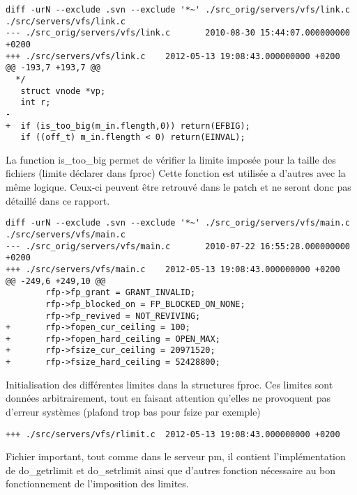 \documentclass[9pt , a4paper]{report}
\begin{document}
\begin{lstlisting}
diff -urN --exclude .svn --exclude '*~' ./src_orig/servers/vfs/link.c ./src/servers/vfs/link.c
--- ./src_orig/servers/vfs/link.c       2010-08-30 15:44:07.000000000 +0200
+++ ./src/servers/vfs/link.c    2012-05-13 19:08:43.000000000 +0200
@@ -193,7 +193,7 @@
  */
   struct vnode *vp;
   int r;
-
+  if (is_too_big(m_in.flength,0)) return(EFBIG);
   if ((off_t) m_in.flength < 0) return(EINVAL); 
\end{lstlisting}
La function is\_too\_big permet de vérifier la limite imposée pour la taille des fichiers (limite déclarer dans fproc)
Cette fonction est utilisée a d'autres avec la même logique. Ceux-ci peuvent être retrouvé dans le patch et ne seront donc pas détaillé dans ce rapport.
\begin{lstlisting}
diff -urN --exclude .svn --exclude '*~' ./src_orig/servers/vfs/main.c ./src/servers/vfs/main.c
--- ./src_orig/servers/vfs/main.c       2010-07-22 16:55:28.000000000 +0200
+++ ./src/servers/vfs/main.c    2012-05-13 19:08:43.000000000 +0200
@@ -249,6 +249,10 @@
        rfp->fp_grant = GRANT_INVALID;
        rfp->fp_blocked_on = FP_BLOCKED_ON_NONE;
        rfp->fp_revived = NOT_REVIVING;
+       rfp->fopen_cur_ceiling = 100;
+       rfp->fopen_hard_ceiling = OPEN_MAX;
+       rfp->fsize_cur_ceiling = 20971520;
+       rfp->fsize_hard_ceiling = 52428800;

\end{lstlisting}

Initialisation des différentes limites dans la structures fproc. Ces limites sont données arbitrairement, tout en faisant attention qu'elles ne provoquent pas d'erreur systèmes (plafond trop bas pour fsize par exemple)

\begin{lstlisting}
+++ ./src/servers/vfs/rlimit.c  2012-05-13 19:08:43.000000000 +0200
\end{lstlisting}
Fichier important, tout comme dans le serveur pm, il contient l'implémentation de do\_getrlimit et do\_setrlimit ainsi que d'autres fonction nécessaire au bon fonctionnement de l'imposition des limites.
\end{document}
